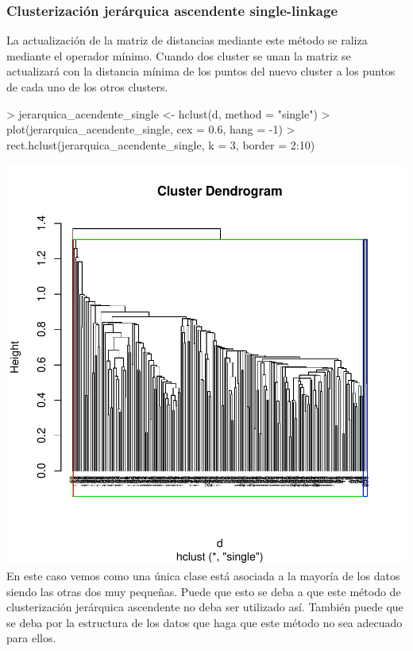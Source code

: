 \documentclass [a4paper] {article}
\begin{document}
\subsubsection{Clusterización jerárquica ascendente single-linkage}
La actualización de la matriz de distancias mediante este método se raliza mediante el operador mínimo.
Cuando dos cluster se unan la matriz se actualizará con la distancia mínima de los puntos del nuevo cluster a los puntos de cada uno de los otros clusters.
\begin{center}
\begin{Schunk}
\begin{Sinput}
> jerarquica_acendente_single <- hclust(d, method = "single")
> plot(jerarquica_acendente_single, cex = 0.6, hang = -1)
> rect.hclust(jerarquica_acendente_single, k = 3, border = 2:10)
\end{Sinput}
\end{Schunk}
\includegraphics{entrega-jerarquica_acendente_single}
En este caso vemos como una única clase está asociada a la mayoría de los datos siendo las otras dos muy pequeñas.
Puede que esto se deba a que este método de clusterización jerárquica ascendente no deba ser utilizado así.
También puede que se deba por la estructura de los datos que haga que este método no sea adecuado para ellos.
\begin{Schunk}

\end{Schunk}
\end{center}
\end{document}
